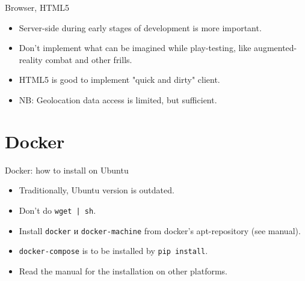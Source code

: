 \documentclass[aspectratio=169,handout,bigger]{beamer}
\begin{document}

\begin{frame}{Browser, HTML5}
  \begin{itemize}
    \item Server-side during early stages of development is more important.
    \item Don't implement what can be imagined while play-testing,
          like augmented-reality combat and other frills.
    \item HTML5 is good to implement "quick and dirty" client.
    \item NB: Geolocation data access is limited, but sufficient.
  \end{itemize}
\end{frame}


\section{Docker}


\begin{frame}{Docker: how to install on Ubuntu}
  \begin{itemize}
    \item Traditionally, Ubuntu version is outdated.
    \item Don't do \texttt{wget | sh}.
    \item Install \texttt{docker} и \texttt{docker-machine}
          from docker's apt-repository (see manual).
    \item \texttt{docker-compose} is to be installed by \texttt{pip install}.
    \item Read the manual for the installation on other platforms.
  \end{itemize}
\end{frame}

\end{document}
